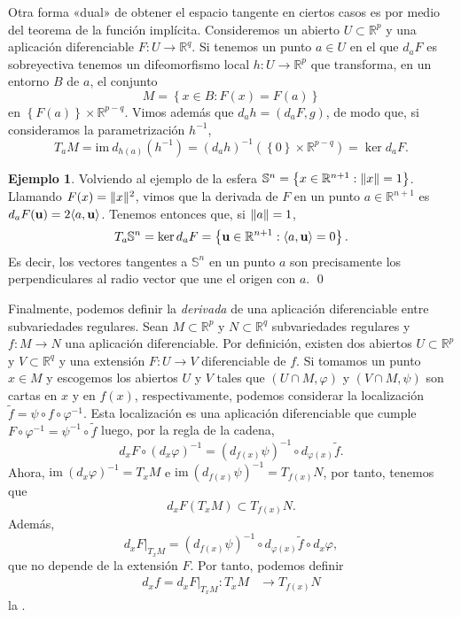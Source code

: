 \documentclass[12pt,a4paper]{book}
\theoremstyle{definition} \newtheorem{defn}[thm]{Definición}
\theoremstyle{definition} \newtheorem{ejemplo}[thm]{Ejemplo}
\theoremstyle{definition} \newtheorem{ejercicio}[thm]{Ejercicio}
\theoremstyle{remark} \newtheorem*{obs}{Observación}
\def\RR{\mathbb{R}}
\def\SF{\mathbb{S}}
\def\im{\mathrm{im}\ }
\newcommand{\ve}[1]{\mathbf{#1}}
\DeclarePairedDelimiter\esc{\langle}{\rangle}
\DeclarePairedDelimiter\norm{\lVert}{\rVert}
\let\emph\relax
\begin{document}
	  Otra forma «dual» de obtener el espacio tangente en ciertos casos es por medio del teorema de la función implícita. Consideremos un abierto $U\subset \RR^p$ y una aplicación diferenciable $F:U\rightarrow \RR^q$. Si tenemos un punto $a\in U$ en el que $d_aF$ es sobreyectiva tenemos un difeomorfismo local $h:U\rightarrow \RR^p$ que transforma, en un entorno $B$ de $a$, el conjunto 
	  \begin{equation*}
M=	    \left\{ x\in B: F(x)=F(a) \right\}
	  \end{equation*}
	  en $\left\{ F(a) \right\}\times \RR^{p-q}$. Vimos además que $d_ah=(d_aF, g)$, de modo que, si consideramos la parametrización $h^{-1}$,
	  \begin{equation*}
	    T_aM=\im d_{h(a)} (h^{-1}) = (d_{a}h)^{-1}(\left\{ 0 \right\}\times \RR^{p-q}) = \ker d_a F.
	  \end{equation*}

	  \begin{ejemplo}
	    Volviendo al ejemplo de la esfera $\SF^n=\left\{ x\in \RR^{n+1}: \norm{x} =1 \right\}$. Llamando $F(x)=\norm{x}^2$, vimos que la derivada de $F$ en un punto $a\in \RR^{n+1}$ es $d_aF(\ve{u})=2\esc{a,\ve{u}}$. Tenemos entonces que, si $\norm{a}=1$,
	    \begin{equation*}
	      T_a \SF^n = \ker d_a F = \left\{ \ve{u} \in \RR^{n+1}: \esc{a,\ve{u}}=0 \right\}.
	    \end{equation*}
	    Es decir, los vectores tangentes a $\SF^n$ en un punto $a$ son precisamente los perpendiculares al radio vector que une el origen con $a$.
	    \qed
	  \end{ejemplo}

	  Finalmente, podemos definir la \textit{derivada} de una aplicación diferenciable entre subvariedades regulares. Sean $M\subset \RR^p$ y $N\subset \RR^q$ subvariedades regulares y $f:M\rightarrow N$ una aplicación diferenciable. Por definición, existen dos abiertos $U\subset \RR^p$ y $V\subset \RR^q$ y una extensión $F:U\rightarrow V$ diferenciable de $f$. Si tomamos un punto $x\in M$ y escogemos los abiertos $U$ y $V$ tales que $(U\cap M,\varphi)$ y $(V\cap M,\psi)$ son cartas en $x$ y en $f(x)$, respectivamente, podemos considerar la localización $\tilde{f}=\psi\circ f \circ \varphi^{-1}$. Esta localización es una aplicación diferenciable que cumple $F \circ \varphi^{-1} =\psi^{-1}\circ \tilde{f}$ luego, por la regla de la cadena, 
	  \begin{equation*}
	    d_x F \circ (d_{x}\varphi)^{-1} = (d_{f(x)}\psi)^{-1} \circ d_{\varphi(x)}\tilde{f}.
	  \end{equation*}
	  Ahora, $\im (d_{x}\varphi)^{-1} = T_xM$ e $\im (d_{f(x)}\psi)^{-1}=T_{f(x)}N$, por tanto, tenemos que $$d_xF(T_xM)\subset T_{f(x)}N.$$ Además, 
	  \begin{equation*}
	    d_xF|_{T_xM}= (d_{f(x)}\psi)^{-1}\circ d_{\varphi(x)}\tilde{f} \circ d_x \varphi,
	  \end{equation*}
	  que no depende de la extensión $F$. Por tanto, podemos definir 
	  \begin{align*}
	    d_xf=d_xF|_{T_x M}:T_xM&\longrightarrow T_{f(x)}N 
	    \end{align*}
	   la \emph{derivada de $f$ en $x$}.
\end{document}
